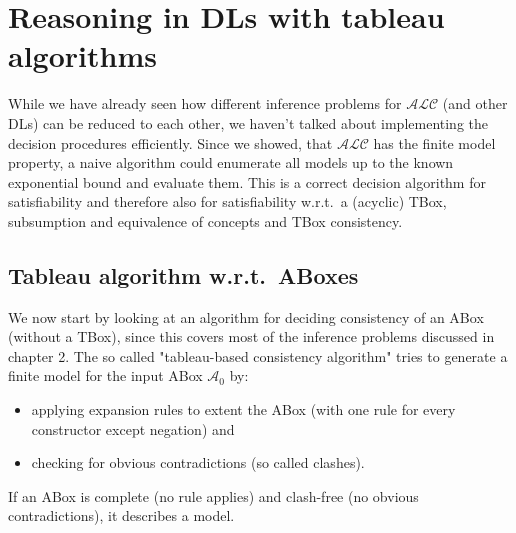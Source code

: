 \chapter{Reasoning in DLs with tableau algorithms}
While we have already seen how different inference problems for $\mathcal{ALC}$ (and other DLs) can be reduced to each other,
we haven't talked about implementing the decision procedures efficiently.
Since we showed, that $\mathcal{ALC}$ has the finite model property, a naive algorithm could enumerate all models up to the known exponential bound
and evaluate them. This is a correct decision algorithm for satisfiability
and therefore also for satisfiability w.r.t.\ a (acyclic) TBox, subsumption and equivalence of concepts and TBox consistency.

\section{Tableau algorithm w.r.t.\ ABoxes}
We now start by looking at an algorithm for deciding consistency of an ABox (without a TBox), since this covers most of the inference problems discussed in chapter 2.
The so called "tableau-based consistency algorithm" tries to generate a finite model for the input ABox $\mathcal{A}_0$ by:
\begin{itemize}
	\item applying expansion rules to extent the ABox (with one rule for every constructor except negation) and
	\item checking for obvious contradictions (so called clashes).
\end{itemize}
If an ABox is complete (no rule applies) and clash-free (no obvious contradictions), it describes a model.

